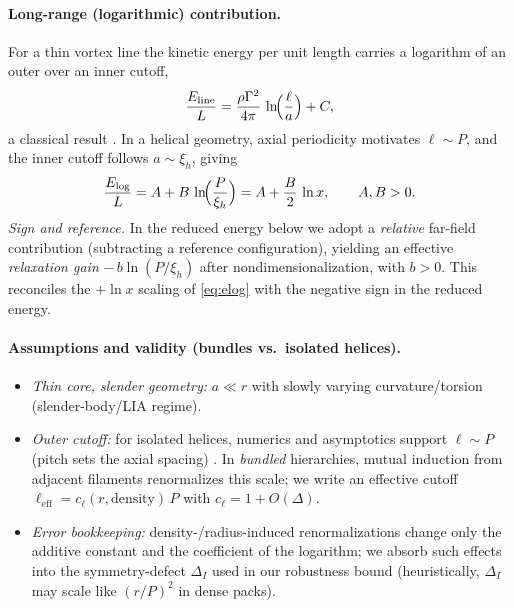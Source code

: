 \documentclass[11pt]{article}
\theoremstyle{remark}
\theoremstyle{definition}
\begin{document}
\paragraph{Long-range (logarithmic) contribution.}
For a thin vortex line the kinetic energy per unit length carries a logarithm of an outer over an inner cutoff,
\begin{equation}
\frac{E_{\text{line}}}{L} = \frac{\rho \Gamma^2}{4\pi}\,\ln\!\Bigl(\frac{\ell}{a}\Bigr) + C,
\label{eq:line-energy}
\end{equation}
a classical result \cite{Saffman1992,Fetter2009}. In a helical geometry, axial periodicity motivates $\ell\sim P$, and the inner cutoff follows $a\sim \xi_h$, giving
\begin{equation}
\frac{E_{\log}}{L} = A + B\,\ln\!\Bigl(\frac{P}{\xi_h}\Bigr) = A + \frac{B}{2}\,\ln x,
\qquad A,B>0.
\label{eq:elog}
\end{equation}
\emph{Sign and reference.} In the reduced energy below we adopt a \emph{relative} far-field contribution (subtracting a reference configuration), yielding an effective \emph{relaxation gain} $-\,b\ln(P/\xi_h)$ after nondimensionalization, with $b>0$. This reconciles the $+\ln x$ scaling of \eqref{eq:elog} with the negative sign in the reduced energy.

\paragraph{Assumptions and validity (bundles vs.\ isolated helices).}
\begin{itemize}
\item \emph{Thin core, slender geometry:} $a\ll r$ with slowly varying curvature/torsion (slender-body/LIA regime).
\item \emph{Outer cutoff:} for isolated helices, numerics and asymptotics support $\ell\sim P$ (pitch sets the axial spacing) \cite{Widnall1972,FukumotoOkulov2005}. In \emph{bundled} hierarchies, mutual induction from adjacent filaments renormalizes this scale; we write an effective cutoff
$\ell_{\mathrm{eff}}=c_\ell(r,\text{density})\,P$ with $c_\ell=1+O(\Delta)$.
\item \emph{Error bookkeeping:} density-/radius-induced renormalizations change only the additive constant and the coefficient of the logarithm; we absorb such effects into the symmetry-defect $\Delta_I$ used in our robustness bound (heuristically, $\Delta_I$ may scale like $(r/P)^2$ in dense packs).
\end{itemize}
\end{document}
